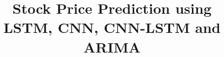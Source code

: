 \documentclass[12pt,journal,compsoc]{IEEEtran}
\begin{document}
%
\title{Stock Price Prediction using LSTM, CNN, CNN-LSTM and ARIMA}
%
%
%
%


% 
%
\end{document}
